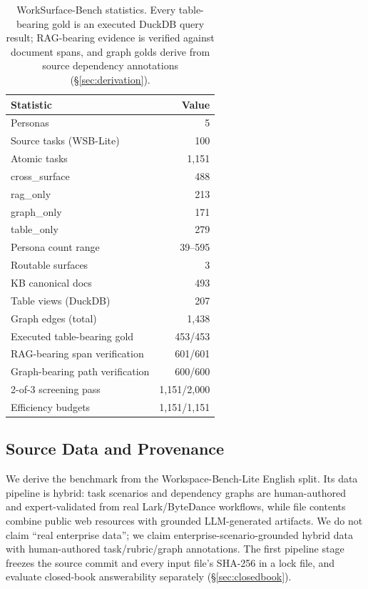 \documentclass[11pt]{article}
\begin{document}
\begin{table}[t]
\centering
\small
\begin{tabular}{lr}
\toprule
\textbf{Statistic} & \textbf{Value} \\
\midrule
Personas & 5 \\
Source tasks (WSB-Lite) & 100 \\
Atomic tasks & 1{,}151 \\
\quad cross\_surface & 488 \\
\quad rag\_only & 213 \\
\quad graph\_only & 171 \\
\quad table\_only & 279 \\
Persona count range & 39--595 \\
Routable surfaces & 3 \\
KB canonical docs & 493 \\
Table views (DuckDB) & 207 \\
Graph edges (total) & 1{,}438 \\
Executed table-bearing gold & 453/453 \\
RAG-bearing span verification & 601/601 \\
Graph-bearing path verification & 600/600 \\
2-of-3 screening pass & 1{,}151/2{,}000 \\
Efficiency budgets & 1{,}151/1{,}151 \\
\bottomrule
\end{tabular}
\caption{WorkSurface-Bench statistics. Every table-bearing gold is an executed
DuckDB query result; RAG-bearing evidence is verified against document spans,
and graph golds derive from source dependency annotations
(\S\ref{sec:derivation}).}
\label{tab:stats}
\end{table}

\subsection{Source Data and Provenance}
\label{sec:provenance}
We derive the benchmark from the Workspace-Bench-Lite English split. Its data
pipeline is hybrid: task scenarios and dependency graphs are human-authored and
expert-validated from real Lark/ByteDance workflows, while file contents
combine public web resources with grounded LLM-generated artifacts. We do not
claim ``real enterprise data''; we claim enterprise-scenario-grounded hybrid
data with human-authored task/rubric/graph annotations. The first pipeline
stage freezes the source commit and every input file's SHA-256 in a lock file,
and evaluate closed-book answerability separately
(\S\ref{sec:closedbook}).
\end{document}
